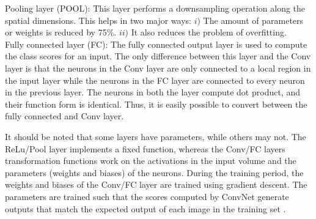 Pooling layer (POOL): This layer performs a downsampling operation along the spatial dimensions. This helps in two major ways: $i)$ The amount of parameters or weights is reduced by 75\%. $ii)$ It also reduces the problem of overfitting.\\
Fully connected layer (FC): The fully connected output layer is used to compute the class scores for an input. The only difference between this layer and the Conv layer is that the neurons in the Conv layer are only connected to a local region in the input layer while the neurons in the FC layer are connected to every neuron in the previous layer. The neurons in both the layer compute dot product, and their function form is identical. Thus, it is easily possible to convert between the fully connected and Conv layer.

It should be noted that some layers have parameters, while others may not. The ReLu/Pool layer implements a fixed function, whereas the Conv/FC layers transformation functions work on the activations in the input volume and the parameters (weights and biases) of the neurons. During the training period, the weights and biases of the Conv/FC layer are trained using gradient descent. The parameters are trained such that the scores computed by ConvNet generate outputs that match the expected output of each image in the training set \cite{convNNStan}.

